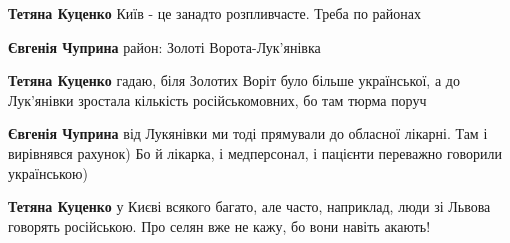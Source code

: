 \begin{itemize}
\begin{itemize}
 
\textbf{Тетяна Куценко} Київ - це занадто розпливчасте. Треба по районах

 
\textbf{Євгенія Чуприна} район: Золоті Ворота-Лук'янівка

 
\textbf{Тетяна Куценко} гадаю, біля Золотих Воріт було більше української, а до Лук'янівки зростала кількість російськомовних, бо там тюрма поруч

 
\textbf{Євгенія Чуприна} від Лукянівки ми тоді прямували до обласної лікарні.
Там і вирівнявся рахунок) Бо й лікарка, і медперсонал, і пацієнти переважно
говорили українською)

 
\textbf{Тетяна Куценко} у Києві всякого багато, але часто, наприклад, люди зі
Львова говорять російською. Про селян вже не кажу, бо вони навіть акають!

 

\end{itemize}
\end{itemize}
